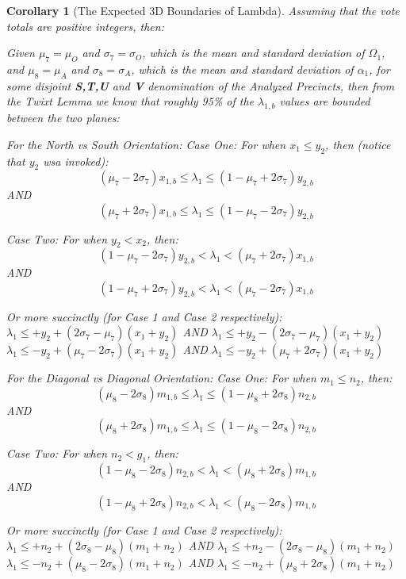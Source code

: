 \documentclass[preprint,13pt]{elsarticle}
\newtheorem{corollary}{Corollary}[theorem]
\begin{document}
\newpage
\begin{corollary}[The Expected 3D Boundaries of Lambda]
Assuming that the vote totals are positive integers, then:

Given $\mu_{7}=\mu_{O}$ and $\sigma_{7}=\sigma_{O}$, which is the mean and standard deviation of $\Omega_{1}$, and $\mu_{8}=\mu_{A}$ and $\sigma_{8}=\sigma_{A}$, which is the mean and standard deviation of $\alpha_{1}$, for some disjoint \textbf{S,T,U} and \textbf{V} denomination of the Analyzed Precincts, then from the Twixt Lemma we know that roughly 95\% of the $\lambda_{1,b}$ values are bounded between the two planes:

For the North vs South Orientation:
Case One:  For when $x_{1} \le y_{2}$, then (notice that $y_{2}$ wsa invoked):
$$(\mu_{7}-2\sigma_{7})x_{1,b} \le \lambda_{1} \le (1-\mu_{7}+2\sigma_{7})y_{2,b}$$
AND
$$(\mu_{7}+2\sigma_{7})x_{1,b} \le \lambda_{1} \le (1-\mu_{7}-2\sigma_{7})y_{2,b}$$

Case Two: For when $y_{2} < x_{2}$, then:
$$(1-\mu_{7}-2\sigma_{7})y_{2,b} < \lambda_{1} < (\mu_{7}+2\sigma_{7})x_{1,b}$$
AND
$$(1-\mu_{7}+2\sigma_{7})y_{2,b} < \lambda_{1} < (\mu_{7}-2\sigma_{7})x_{1,b}$$

Or more succinctly (for Case 1 and Case 2 respectively):\\
$\lambda_{1} \le +y_{2}+(2\sigma_{7}-\mu_{7})(x_{1}+y_{2})$ AND $\lambda_{1} \le +y_{2}-(2\sigma_{7}-\mu_{7})(x_{1}+y_{2})$\\
$\lambda_{1} \le -y_{2}+(\mu_{7}-2\sigma_{7})(x_{1}+y_{2})$ AND $\lambda_{1} \le -y_{2}+(\mu_{7}+2\sigma_{7})(x_{1}+y_{2})$

For the Diagonal vs Diagonal Orientation:
Case One:  For when $m_{1} \le n_{2}$, then:
$$(\mu_{8}-2\sigma_{8})m_{1,b} \le \lambda_{1} \le (1-\mu_{8}+2\sigma_{8})n_{2,b}$$
AND
$$(\mu_{8}+2\sigma_{8})m_{1,b} \le \lambda_{1} \le (1-\mu_{8}-2\sigma_{8})n_{2,b}$$

Case Two: For when $n_{2} < g_{1}$, then:
$$(1-\mu_{8}-2\sigma_{8})n_{2,b} < \lambda_{1} < (\mu_{8}+2\sigma_{8})m_{1,b}$$
AND
$$(1-\mu_{8}+2\sigma_{8})n_{2,b} < \lambda_{1} < (\mu_{8}-2\sigma_{8})m_{1,b}$$

Or more succinctly (for Case 1 and Case 2 respectively):\\
$\lambda_{1} \le +n_{2}+(2\sigma_{8}-\mu_{8})(m_{1}+n_{2})$ AND $\lambda_{1} \le +n_{2}-(2\sigma_{8}-\mu_{8})(m_{1}+n_{2})$\\
$\lambda_{1} \le -n_{2}+(\mu_{8}-2\sigma_{8})(m_{1}+n_{2})$ AND $\lambda_{1} \le -n_{2}+(\mu_{8}+2\sigma_{8})(m_{1}+n_{2})$
\end{corollary}
\end{document}

